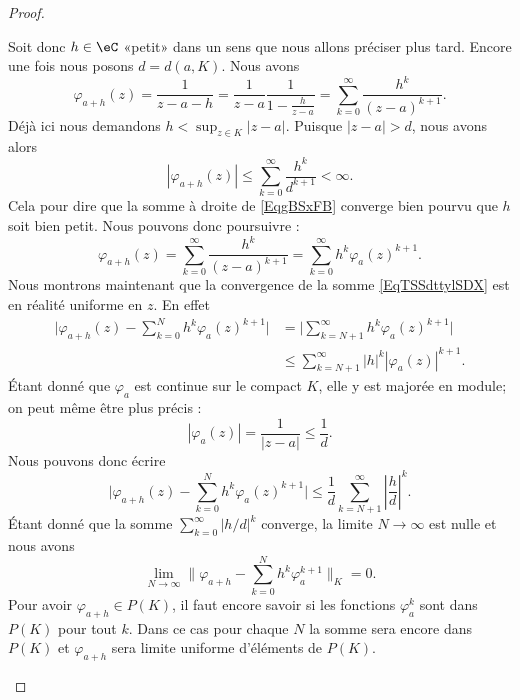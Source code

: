 \begin{proof}
\begin{subproof}
        Soit donc \( h\in \eC\) «petit» dans un sens que nous allons préciser plus tard. Encore une fois nous posons \( d=d(a,K)\). Nous avons
        \begin{equation}        \label{EqgBSxFB}
            \varphi_{a+h}(z)=\frac{1}{ z-a-h }=\frac{1}{ z-a }\frac{1}{ 1-\frac{ h }{ z-a } }=\sum_{k=0}^{\infty}\frac{ h^k }{ (z-a)^{k+1} }.
        \end{equation}
        Déjà ici nous demandons \( h<\sup_{z\in K}| z-a |\). Puisque \( | z-a |>d\), nous avons alors
        \begin{equation}
            | \varphi_{a+h}(z) |\leq \sum_{k=0}^{\infty}\frac{ h^k }{ d^{k+1} }<\infty.
        \end{equation}
        Cela pour dire que la somme à droite de \eqref{EqgBSxFB} converge bien pourvu que \( h\) soit bien petit. Nous pouvons donc poursuivre :
        \begin{equation}    \label{EqTSSdttylSDX}
            \varphi_{a+h}(z)=\sum_{k=0}^{\infty}\frac{ h^k }{ (z-a)^{k+1} }=\sum_{k=0}^{\infty}h^k\varphi_a(z)^{k+1}.
        \end{equation}
        Nous montrons maintenant que la convergence de la somme \eqref{EqTSSdttylSDX} est en réalité uniforme en \( z\). En effet
        \begin{subequations}
            \begin{align}
                \big| \varphi_{a+h}(z)-\sum_{k=0}^Nh^k\varphi_a(z)^{k+1} \big|&=\big| \sum_{k=N+1}^{\infty}h^k\varphi_a(z)^{k+1} \big|\\
                &\leq\sum_{k=N+1}^{\infty}| h |^k| \varphi_a(z) |^{k+1}.
            \end{align}
        \end{subequations}
        Étant donné que \( \varphi_a\) est continue sur le compact \( K\), elle y est majorée en module; on peut même être plus précis :
        \begin{equation}
            |\varphi_a(z)|=\frac{1}{ | z-a | }\leq \frac{1}{ d }.
        \end{equation}
        Nous pouvons donc écrire
        \begin{equation}
            \big| \varphi_{a+h}(z)-\sum_{k=0}^Nh^k\varphi_a(z)^{k+1} \big|\leq\frac{1}{ d }\sum_{k=N+1}^{\infty}\left| \frac{ h }{ d } \right|^k.
        \end{equation}
        Étant donné que la somme \( \sum_{k=0}^{\infty}| h/d |^k\) converge, la limite \( N\to \infty\) est nulle et nous avons
        \begin{equation}
            \lim_{N\to \infty} \| \varphi_{a+h}-\sum_{k=0}^Nh^k\varphi_a^{k+1} \|_K=0.
        \end{equation}
        Pour avoir \( \varphi_{a+h}\in P(K)\), il faut encore savoir si les fonctions \( \varphi_a^{k}\) sont dans \( P(K)\) pour tout \( k\). Dans ce cas pour chaque \( N\) la somme sera encore dans \( P(K)\) et \( \varphi_{a+h}\) sera limite uniforme d'éléments de \( P(K)\).


\end{subproof}
\end{proof}
